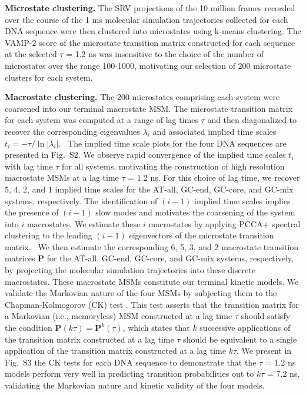 \documentclass[journal=jpcbfk,manuscript=article]{achemso}
\newcommand*{\blauw}[1]{{#1}}
\begin{document}
\textbf{Microstate clustering.} The SRV projections of the 10 million frames recorded over the course of the 1 ms molecular simulation trajectories collected for each DNA sequence were then clustered into microstates using k-means clustering. The VAMP-2 score of the microstate transition matrix constructed for each sequence at the selected $\tau$ = 1.2 ns was insensitive to the choice of the number of microstates over the range 100-1000, motivating our selection of 200 microstate clusters for each system.

\textbf{Macrostate clustering.} The 200 microstates comprising each system were coarsened into our terminal macrostate MSM. The microstate transition matrix for each system was computed at a range of lag times $\tau$ and then diagonalized to recover the corresponding eigenvalues $\lambda_i$ and associated implied time scales $t_i = -\tau / \ln \left| \lambda_i \right|$.~\citep{Wehmeyer2019IntroductionSoftware} The implied time scale plots for the four DNA sequences are presented in \blauw{Fig.~S2}. We observe rapid convergence of the implied time scales $t_i$ with lag time $\tau$ for all systems, motivating the construction of high resolution macrostate MSMs at a lag time $\tau$ = 1.2 ns. For this choice of lag time, we recover 5, 4, 2, and 1 implied time scales for the AT-all, GC-end, GC-core, and GC-mix systems, respectively. The identification of $(i-1)$ implied time scales implies the presence of $(i-1)$ slow modes and motivates the coarsening of the system into $i$ macrostates. We estimate these $i$ macrostates by applying PCCA+ spectral clustering to the leading $(i-1)$ eigenvectors of the microstate transition matrix.~\citep{Roblitz2013FuzzyClassification, Weber2018ImplicationsSimulation, Kube2007AConformations} We then estimate the corresponding 6, 5, 3, and 2 macrostate transition matrices $\mathbf{P}$ for the AT-all, GC-end, GC-core, and GC-mix systems, respectively, by projecting the molecular simulation trajectories into these discrete macrostates. These macrostate MSMs constitute our terminal kinetic models. We validate the Markovian nature of the four MSMs by subjecting them to the Chapman-Kolmogorov (CK) test \citep{Noe2009ConstructingSimulations,Prinz2011OptimalDynamics, Wehmeyer2019IntroductionSoftware}. This test asserts that the transition matrix for a Markovian (i.e., memoryless) MSM constructed at a lag time $\tau$ should satisfy the condition $\mathbf{P}(k \tau) = \mathbf{P}^k(\tau)$, which states that $k$ successive applications of the transition matrix constructed at a lag time $\tau$ should be equivalent to a single application of the transition matrix constructed at a lag time $k \tau$. We present in \blauw{Fig.~S3} the CK tests for each DNA sequence to demonstrate that the $\tau$ = 1.2 ns models perform very well in predicting transition probabilities out to $k \tau$ = 7.2 ns, validating the Markovian nature and kinetic validity of the four models.
\end{document}
